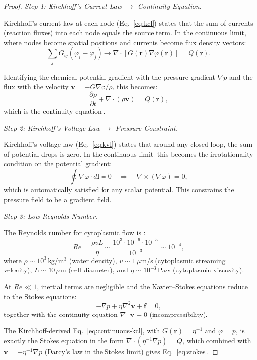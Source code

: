 \documentclass[11pt,twocolumn,a4paper]{article}
\begin{document}
\begin{proof}
\textit{Step 1: Kirchhoff's Current Law $\to$ Continuity Equation.}

Kirchhoff's current law at each node (Eq.~\eqref{eq:kcl}) states that
the sum of currents (reaction fluxes) into each node equals the source
term. In the continuous limit, where nodes become spatial positions and
currents become flux density vectors:
\begin{equation}
\sum_j G_{ij}(\varphi_i - \varphi_j) \to
  \nabla \cdot [G(\mathbf{r}) \nabla\varphi(\mathbf{r})]
  = Q(\mathbf{r}).
\label{eq:continuous-kcl}
\end{equation}

Identifying the chemical potential gradient with the pressure gradient
$\nabla p$ and the flux with the velocity $\mathbf{v} = -G \nabla
\varphi / \rho$, this becomes:
\begin{equation}
\frac{\partial \rho}{\partial t} +
  \nabla \cdot (\rho \mathbf{v}) = Q(\mathbf{r}),
\label{eq:continuity}
\end{equation}
which is the continuity equation \citep{navierstokes}.

\textit{Step 2: Kirchhoff's Voltage Law $\to$ Pressure Constraint.}

Kirchhoff's voltage law (Eq.~\eqref{eq:kvl}) states that around any
closed loop, the sum of potential drops is zero. In the continuous
limit, this becomes the irrotationality condition on the potential
gradient:
\begin{equation}
\oint \nabla\varphi \cdot d\mathbf{l} = 0
  \quad \Longrightarrow \quad
  \nabla \times (\nabla\varphi) = 0,
\label{eq:continuous-kvl}
\end{equation}
which is automatically satisfied for any scalar potential. This
constrains the pressure field to be a gradient field.

\textit{Step 3: Low Reynolds Number.}

The Reynolds number for cytoplasmic flow is
\citep{purcell1977,bergetal2002}:
\begin{equation}
Re = \frac{\rho v L}{\eta} \sim
  \frac{10^3 \cdot 10^{-6} \cdot 10^{-5}}{10^{-3}}
  \sim 10^{-4},
\label{eq:reynolds}
\end{equation}
where $\rho \sim 10^3$\,kg/m$^3$ (water density),
$v \sim 1$\,$\mu$m/s (cytoplasmic streaming velocity),
$L \sim 10$\,$\mu$m (cell diameter), and
$\eta \sim 10^{-3}$\,Pa$\cdot$s (cytoplasmic viscosity).

At $Re \ll 1$, inertial terms are negligible and the Navier--Stokes
equations reduce to the Stokes equations:
\begin{equation}
-\nabla p + \eta \nabla^2 \mathbf{v} + \mathbf{f} = 0,
\label{eq:stokes}
\end{equation}
together with the continuity equation
$\nabla \cdot \mathbf{v} = 0$ (incompressibility).

The Kirchhoff-derived Eq.~\eqref{eq:continuous-kcl}, with
$G(\mathbf{r}) = \eta^{-1}$ and $\varphi = p$, is exactly the
Stokes equation in the form $\nabla \cdot (\eta^{-1} \nabla p)
= Q$, which combined with $\mathbf{v} = -\eta^{-1} \nabla p$
(Darcy's law in the Stokes limit) gives Eq.~\eqref{eq:stokes}.
\end{proof}
\end{document}
